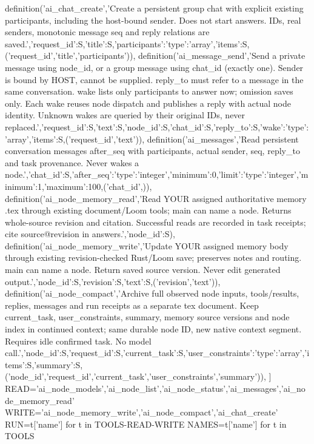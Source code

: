  definition('ai_chat_create','Create a persistent group chat with explicit existing participants, including the host-bound sender. Does not start answers. IDs, real senders, monotonic message seq and reply relations are saved.',{'request_id':S,'title':S,'participants':{'type':'array','items':S}},('request_id','title','participants')),
 definition('ai_message_send','Send a private message using node_id, or a group message using chat_id (exactly one). Sender is bound by HOST, cannot be supplied. reply_to must refer to a message in the same conversation. wake lists only participants to answer now; omission saves only. Each wake reuses node dispatch and publishes a reply with actual node identity. Unknown wakes are queried by their original IDs, never replaced.',{'request_id':S,'text':S,'node_id':S,'chat_id':S,'reply_to':S,'wake':{'type':'array','items':S}},('request_id','text')),
 definition('ai_messages','Read persistent conversation messages after_seq with participants, actual sender, seq, reply_to and task provenance. Never wakes a node.',{'chat_id':S,'after_seq':{'type':'integer','minimum':0},'limit':{'type':'integer','minimum':1,'maximum':100}},('chat_id',)),
 definition('ai_node_memory_read','Read YOUR assigned authoritative memory .tex through existing document/Loom tools; main can name a node. Returns whole-source revision and citation. Successful reads are recorded in task receipts; cite source@revision in answers.',{'node_id':S}),
 definition('ai_node_memory_write','Update YOUR assigned memory body through existing revision-checked Rust/Loom save; preserves notes and routing. main can name a node. Return saved source version. Never edit generated output.',{'node_id':S,'revision':S,'text':S},('revision','text')),
 definition('ai_node_compact','Archive full observed node inputs, tools/results, replies, messages and run receipts as a separate tex document. Keep current_task, user_constraints, summary, memory source versions and node index in continued context; same durable node ID, new native context segment. Requires idle confirmed task. No model call.',{'node_id':S,'request_id':S,'current_task':S,'user_constraints':{'type':'array','items':S},'summary':S},('node_id','request_id','current_task','user_constraints','summary')),
]
READ={'ai_node_models','ai_node_list','ai_node_status','ai_messages','ai_node_memory_read'}
WRITE={'ai_node_memory_write','ai_node_compact','ai_chat_create'}
RUN={t['name'] for t in TOOLS}-READ-WRITE
NAMES={t['name'] for t in TOOLS}

